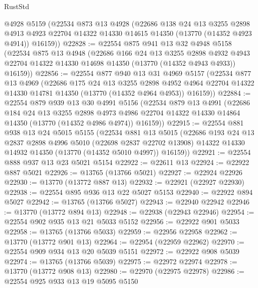 \begin{lexlean}{RustStd}
\begin{coremodule}
    @4928
    @5159
    (@22534
      @873
      @13
      @4928
      (@22686
        @138
        @24
        @13
        @3255
        @2898
        @4913
        @4923
        @22704
        @14322
        @14330
        @14615
        @14350
        (@13770 (@14352 @4923 @4914))
        @16159))
@22828 := @22554
    @875
    @941
    @13
    @32
    @4948
    @5158
    (@22534
      @875
      @13
      @4948
      (@22686
        @166
        @24
        @13
        @3255
        @2898
        @4932
        @4943
        @22704
        @14322
        @14330
        @14698
        @14350
        (@13770 (@14352 @4943 @4933))
        @16159))
@22856 := @22554
    @877
    @940
    @13
    @31
    @4969
    @5157
    (@22534
      @877
      @13
      @4969
      (@22686
        @175
        @24
        @13
        @3255
        @2898
        @4952
        @4964
        @22704
        @14322
        @14330
        @14781
        @14350
        (@13770 (@14352 @4964 @4953))
        @16159))
@22884 := @22554
    @879
    @939
    @13
    @30
    @4991
    @5156
    (@22534
      @879
      @13
      @4991
      (@22686
        @184
        @24
        @13
        @3255
        @2898
        @4973
        @4986
        @22704
        @14322
        @14330
        @14864
        @14350
        (@13770 (@14352 @4986 @4974))
        @16159))
@22915 := @22554
    @881
    @938
    @13
    @24
    @5015
    @5155
    (@22534
      @881
      @13
      @5015
      (@22686
        @193
        @24
        @13
        @2837
        @2898
        @4996
        @5010
        (@22698 @2837 @22702 @13908)
        @14322
        @14330
        @14932
        @14350
        (@13770 (@14352 @5010 @4997))
        @16159))
@22921 := @22554 @888 @937 @13 @23 @5021 @5154
@22922 := @22611 @13
@22924 := @22922 @887 @5021
@22926 := @13765 (@13766 @5021)
@22927 := @22924 @22926
@22930 := @13770 (@13772 @887 @13)
@22932 := @22921 (@22927 @22930)
@22938 := @22554 @895 @936 @13 @22 @5027 @5153
@22940 := @22922 @894 @5027
@22942 := @13765 (@13766 @5027)
@22943 := @22940 @22942
@22946 := @13770 (@13772 @894 @13)
@22948 := @22938 (@22943 @22946)
@22954 := @22554 @902 @935 @13 @21 @5033 @5152
@22956 := @22922 @901 @5033
@22958 := @13765 (@13766 @5033)
@22959 := @22956 @22958
@22962 := @13770 (@13772 @901 @13)
@22964 := @22954 (@22959 @22962)
@22970 := @22554 @909 @934 @13 @20 @5039 @5151
@22972 := @22922 @908 @5039
@22974 := @13765 (@13766 @5039)
@22975 := @22972 @22974
@22978 := @13770 (@13772 @908 @13)
@22980 := @22970 (@22975 @22978)
@22986 := @22554 @925 @933 @13 @19 @5095 @5150

\end{coremodule}
\end{lexlean}
